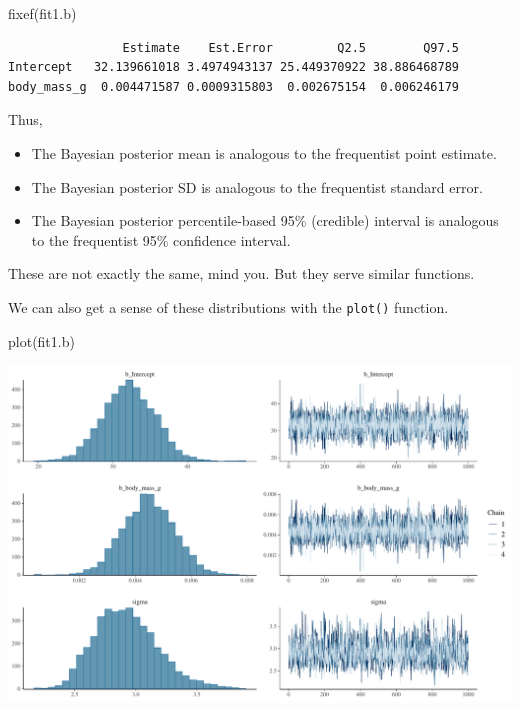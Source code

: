 \documentclass[
  letterpaper,
  DIV=11,
  numbers=noendperiod]{scrartcl}
\newenvironment{Shaded}{\begin{snugshade}}{\end{snugshade}}
\newcommand{\FunctionTok}[1]{\textcolor[rgb]{0.28,0.35,0.67}{#1}}
\newcommand{\NormalTok}[1]{\textcolor[rgb]{0.00,0.23,0.31}{#1}}
\providecommand{\tightlist}{%
  \setlength{\itemsep}{0pt}\setlength{\parskip}{0pt}}\usepackage{longtable,booktabs,array}
\begin{document}
\begin{Shaded}
\begin{Highlighting}[]
\FunctionTok{fixef}\NormalTok{(fit1.b)}
\end{Highlighting}
\end{Shaded}

\begin{verbatim}
                Estimate    Est.Error         Q2.5        Q97.5
Intercept   32.139661018 3.4974943137 25.449370922 38.886468789
body_mass_g  0.004471587 0.0009315803  0.002675154  0.006246179
\end{verbatim}

Thus,

\begin{itemize}
\tightlist
\item
  The Bayesian posterior mean is analogous to the frequentist point
  estimate.
\item
  The Bayesian posterior SD is analogous to the frequentist standard
  error.
\item
  The Bayesian posterior percentile-based 95\% (credible) interval is
  analogous to the frequentist 95\% confidence interval.
\end{itemize}

These are not exactly the same, mind you. But they serve similar
functions.

We can also get a sense of these distributions with the \texttt{plot()}
function.

\begin{Shaded}
\begin{Highlighting}[]
\FunctionTok{plot}\NormalTok{(fit1.b)}
\end{Highlighting}
\end{Shaded}

\includegraphics{Bayes_Lab_1_files/figure-pdf/unnamed-chunk-37-1.pdf}
\end{document}
